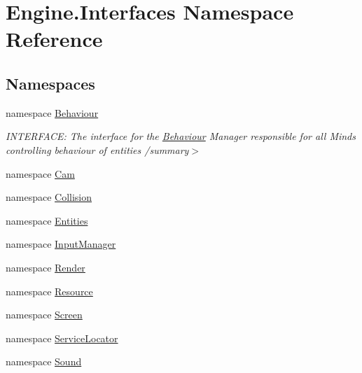 \hypertarget{a00253}{}\section{Engine.\+Interfaces Namespace Reference}
\label{a00253}
\subsection*{Namespaces}
\begin{DoxyCompactItemize}
\item 
namespace \hyperlink{a00252}{Behaviour}
\begin{DoxyCompactList}\small\item\em I\+N\+T\+E\+R\+F\+A\+CE\+: The interface for the \hyperlink{a00252}{Behaviour} Manager responsible for all Mind\textquotesingle{}s controlling behaviour of entities /summary$>$ \end{DoxyCompactList}\item 
namespace \hyperlink{a00254}{Cam}
\item 
namespace \hyperlink{a00255}{Collision}
\item 
namespace \hyperlink{a00259}{Entities}
\item 
namespace \hyperlink{a00260}{Input\+Manager}
\item 
namespace \hyperlink{a00261}{Render}
\item 
namespace \hyperlink{a00262}{Resource}
\item 
namespace \hyperlink{a00263}{Screen}
\item 
namespace \hyperlink{a00264}{Service\+Locator}
\item 
namespace \hyperlink{a00265}{Sound}
\end{DoxyCompactItemize}
